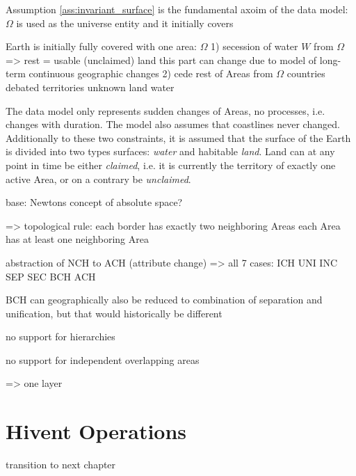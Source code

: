 Assumption \ref{ass:invariant_surface} is the fundamental axoim of the data model: $\Omega$ is used as the universe entity and it initially covers



Earth is initially fully covered with one area: $\Omega$
1) secession of water $W$ from $\Omega$
    => rest = usable (unclaimed) land
    this part can change due to model of long-term continuous geographic changes
2) cede rest of Areas from $\Omega$
  countries
  debated territories
  unknown land
  water

The data model only represents sudden changes of Areas, no processes, i.e. changes with duration. The model also assumes that coastlines never changed. Additionally to these two constraints, it is assumed that the surface of the Earth is divided into two types surfaces: \emph{water} and habitable \emph{land}. Land can at any point in time be either \emph{claimed}, i.e. it is currently the territory of exactly one active Area, or on a contrary be \emph{unclaimed}.

base: Newtons concept of absolute space?

=> topological rule:
each border has exactly two neighboring Areas
each Area has at least one neighboring Area

abstraction of NCH to ACH (attribute change) => all 7 cases:
ICH
UNI INC
SEP SEC
BCH ACH

BCH can geographically also be reduced to combination of separation and unification, but that would historically be different

no support for hierarchies

no support for independent overlapping areas

=> one layer


\section{Hivent Operations} %
\label{sec:hivent_operations}





\vspace{2em}
transition to next chapter

